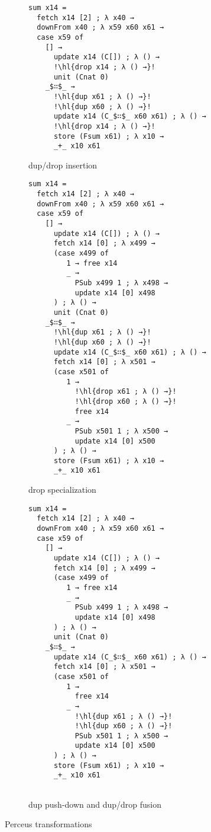 \documentclass[10pt, twocolumn]{article}
\newcommand{\hl}[2][lightgray]{\colorbox{#1}{#2}}
\begin{document}
\begin{figure*}[hp]
\begin{mdframed}
\centering
\setlength{\fboxsep}{0pt} %
\begin{subfigure}[t]{0.50\textwidth}
\centering
\begin{lstlisting}
sum x14 =
  fetch x14 [2] ; λ x40 →
  downFrom x40 ; λ x59 x60 x61 →
  case x59 of
    [] →
      update x14 (C[]) ; λ () →
      !\hl{drop x14 ; λ () →}!
      unit (Cnat 0)
    _$∷$_ →
      !\hl{dup x61 ; λ () →}!
      !\hl{dup x60 ; λ () →}!
      update x14 (C_$∷$_ x60 x61) ; λ () →
      !\hl{drop x14 ; λ () →}!
      store (Fsum x61) ; λ x10 →
      _+_ x10 x61
\end{lstlisting}
\caption{dup/drop insertion}
\label{fig:drop-insert}
\end{subfigure}\par\medskip
\begin{subfigure}[b]{0.48\textwidth}
\centering
\begin{lstlisting}
sum x14 =
  fetch x14 [2] ; λ x40 →
  downFrom x40 ; λ x59 x60 x61 →
  case x59 of
    [] →
      update x14 (C[]) ; λ () →
      fetch x14 [0] ; λ x499 →
      (case x499 of
         1 → free x14
         _ →
           PSub x499 1 ; λ x498 →
           update x14 [0] x498
      ) ; λ () →
      unit (Cnat 0)
    _$∷$_ →
      !\hl{dup x61 ; λ () →}!
      !\hl{dup x60 ; λ () →}!
      update x14 (C_$∷$_ x60 x61) ; λ () →
      fetch x14 [0] ; λ x501 →
      (case x501 of
         1 →
           !\hl{drop x61 ; λ () →}!
           !\hl{drop x60 ; λ () →}!
           free x14
         _ →
           PSub x501 1 ; λ x500 →
           update x14 [0] x500
      ) ; λ () →
      store (Fsum x61) ; λ x10 →
      _+_ x10 x61
\end{lstlisting}
\caption{drop specialization}
\label{fig:drop-spec}
\end{subfigure}
\begin{subfigure}[b]{0.48\textwidth}
\begin{lstlisting}[showlines=true]
sum x14 =
  fetch x14 [2] ; λ x40 →
  downFrom x40 ; λ x59 x60 x61 →
  case x59 of
    [] →
      update x14 (C[]) ; λ () →
      fetch x14 [0] ; λ x499 →
      (case x499 of
         1 → free x14
         _ →
           PSub x499 1 ; λ x498 →
           update x14 [0] x498
      ) ; λ () →
      unit (Cnat 0)
    _$∷$_ →
      update x14 (C_$∷$_ x60 x61) ; λ () →
      fetch x14 [0] ; λ x501 →
      (case x501 of
         1 →
           free x14
         _ →
           !\hl{dup x61 ; λ () →}!
           !\hl{dup x60 ; λ () →}!
           PSub x501 1 ; λ x500 →
           update x14 [0] x500
      ) ; λ () →
      store (Fsum x61) ; λ x10 →
      _+_ x10 x61


\end{lstlisting}
\caption{dup push-down and dup/drop fusion}
\label{fig:dup/drop-fusion}
\end{subfigure}
\end{mdframed}
\caption{Perceus transformations}
\label{fig:perceus}
\end{figure*}
\end{document}
